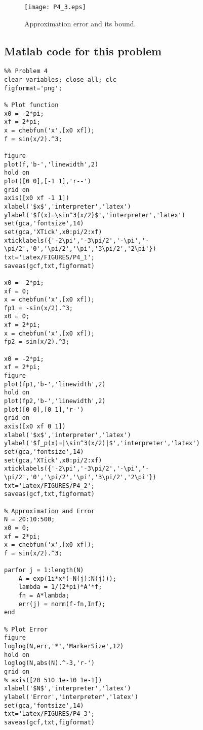 \begin{figure}[H]
\centering     %
{\texttt{[image: P4\_3.eps]}}
\caption{Approximation error and its bound.}
\end{figure}

\subsection*{Matlab code for this problem}
\begin{verbatim}
%% Problem 4
clear variables; close all; clc
figformat='png';

% Plot function
x0 = -2*pi;
xf = 2*pi;
x = chebfun('x',[x0 xf]);
f = sin(x/2).^3;

figure
plot(f,'b-','linewidth',2)
hold on
plot([0 0],[-1 1],'r--')
grid on
axis([x0 xf -1 1])
xlabel('$x$','interpreter','latex')
ylabel('$f(x)=\sin^3(x/2)$','interpreter','latex')
set(gca,'fontsize',14)
set(gca,'XTick',x0:pi/2:xf) 
xticklabels({'-2\pi','-3\pi/2','-\pi','-\pi/2','0','\pi/2','\pi','3\pi/2','2\pi'})
txt='Latex/FIGURES/P4_1';
saveas(gcf,txt,figformat)

x0 = -2*pi;
xf = 0;
x = chebfun('x',[x0 xf]);
fp1 = -sin(x/2).^3;
x0 = 0;
xf = 2*pi;
x = chebfun('x',[x0 xf]);
fp2 = sin(x/2).^3;

x0 = -2*pi;
xf = 2*pi;
figure
plot(fp1,'b-','linewidth',2)
hold on
plot(fp2,'b-','linewidth',2)
plot([0 0],[0 1],'r-')
grid on
axis([x0 xf 0 1])
xlabel('$x$','interpreter','latex')
ylabel('$f_p(x)=|\sin^3(x/2)|$','interpreter','latex')
set(gca,'fontsize',14)
set(gca,'XTick',x0:pi/2:xf) 
xticklabels({'-2\pi','-3\pi/2','-\pi','-\pi/2','0','\pi/2','\pi','3\pi/2','2\pi'})
txt='Latex/FIGURES/P4_2';
saveas(gcf,txt,figformat)

% Approximation and Error
N = 20:10:500;
x0 = 0;
xf = 2*pi;
x = chebfun('x',[x0 xf]);
f = sin(x/2).^3;

parfor j = 1:length(N)
    A = exp(1i*x*(-N(j):N(j)));
    lambda = 1/(2*pi)*A'*f;
    fn = A*lambda;
    err(j) = norm(f-fn,Inf);
end

% Plot Error
figure
loglog(N,err,'*','MarkerSize',12)
hold on
loglog(N,abs(N).^-3,'r-')
grid on
% axis([20 510 1e-10 1e-1])
xlabel('$N$','interpreter','latex')
ylabel('Error','interpreter','latex')
set(gca,'fontsize',14)
txt='Latex/FIGURES/P4_3';
saveas(gcf,txt,figformat)
\end{verbatim}